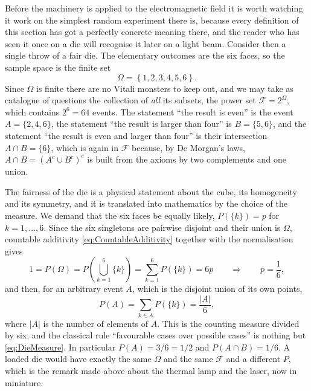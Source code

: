 		Before the machinery is applied to the electromagnetic field it is worth watching it work
		on the simplest random experiment there is, because every definition of this section has
		got a perfectly concrete meaning there, and the reader who has seen it once on a die
		will recognise it later on a light beam. Consider then a single throw of a fair die. The
		elementary outcomes are the six faces, so the sample space is the finite set
		\begin{equation}\label{eq:DieSampleSpace}
			\Omega = \left\{1,2,3,4,5,6\right\}.
		\end{equation}
		Since $\Omega$ is finite there are no Vitali monsters to keep out, and we may take as
		catalogue of questions the collection of \textit{all} its subsets, the power set
		$\mathcal{F} = 2^{\Omega}$, which contains $2^{6}=64$ events. The statement ``the result
		is even'' is the event $A = \{2,4,6\}$, the statement ``the result is larger than four''
		is $B = \{5,6\}$, and the statement ``the result is even and larger than four'' is their
		intersection $A\cap B = \{6\}$, which is again in $\mathcal{F}$ because, by De Morgan's
		laws, $A\cap B = \left(A^{c}\cup B^{c}\right)^{c}$ is built from the axioms by two
		complements and one union.

		The fairness of the die is a physical statement about the cube, its homogeneity and its
		symmetry, and it is translated into mathematics by the choice of the measure. We demand
		that the six faces be equally likely, $P(\{k\}) = p$ for $k=1,\dots,6$. Since the six
		singletons are pairwise disjoint and their union is $\Omega$, countable additivity
		\eqref{eq:CountableAdditivity} together with the normalisation gives
		\begin{equation*}
			1 = P(\Omega) = P\left(\bigcup_{k=1}^{6}\{k\}\right) = \sum_{k=1}^{6}P(\{k\}) = 6p
			\qquad\Longrightarrow\qquad p = \frac{1}{6},
		\end{equation*}
		and then, for an arbitrary event $A$, which is the disjoint union of its own points,
		\begin{equation}\label{eq:DieMeasure}
			P(A) = \sum_{k\in A}P(\{k\}) = \frac{|A|}{6},
		\end{equation}
		where $|A|$ is the number of elements of $A$. This is the counting measure divided by
		six, and the classical rule ``favourable cases over possible cases'' is nothing but
		\eqref{eq:DieMeasure}. In particular $P(A) = 3/6 = 1/2$ and $P(A\cap B) = 1/6$. A loaded
		die would have exactly the same $\Omega$ and the same $\mathcal{F}$ and a different $P$,
		which is the remark made above about the thermal lamp and the laser, now in miniature.

